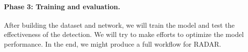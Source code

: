 \documentclass[letterpaper,twocolumn,10pt]{article}
\newcommand{\work}{\mbox{\textsc{RADAR}}\xspace}
\begin{document}
\paragraph{Phase 3: Training and evaluation.} After building the dataset and network, we will train the model and test the effectiveness of the detection.
We will try to make efforts to optimize the model performance.
In the end, we might produce a full workflow for \work.



{\footnotesize 
}


\end{document}
